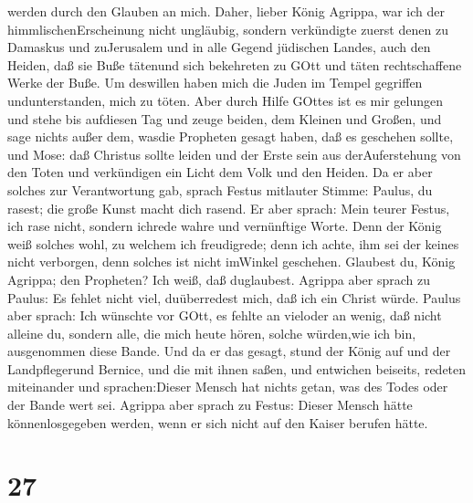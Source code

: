werden durch den Glauben an mich.  Daher, lieber König
Agrippa, war ich der himmlischenErscheinung nicht ungläubig,
 sondern verkündigte zuerst denen zu Damaskus und
zuJerusalem und in alle Gegend jüdischen Landes, auch den Heiden, daß
sie Buße tätenund sich bekehreten zu GOtt und täten rechtschaffene Werke
der Buße.  Um deswillen haben mich die Juden im Tempel
gegriffen undunterstanden, mich zu töten.  Aber durch Hilfe
GOttes ist es mir gelungen und stehe bis aufdiesen Tag und zeuge beiden,
dem Kleinen und Großen, und sage nichts außer dem, wasdie Propheten
gesagt haben, daß es geschehen sollte, und Mose:  daß
Christus sollte leiden und der Erste sein aus derAuferstehung von den
Toten und verkündigen ein Licht dem Volk und den Heiden. 
Da er aber solches zur Verantwortung gab, sprach Festus mitlauter
Stimme: Paulus, du rasest; die große Kunst macht dich rasend.
 Er aber sprach: Mein teurer Festus, ich rase nicht,
sondern ichrede wahre und vernünftige Worte.  Denn der
König weiß solches wohl, zu welchem ich freudigrede; denn ich achte, ihm
sei der keines nicht verborgen, denn solches ist nicht imWinkel
geschehen.  Glaubest du, König Agrippa; den Propheten? Ich
weiß, daß duglaubest.  Agrippa aber sprach zu Paulus: Es
fehlet nicht viel, duüberredest mich, daß ich ein Christ würde.
 Paulus aber sprach: Ich wünschte vor GOtt, es fehlte an
vieloder an wenig, daß nicht alleine du, sondern alle, die mich heute
hören, solche würden,wie ich bin, ausgenommen diese Bande. 
Und da er das gesagt, stund der König auf und der Landpflegerund
Bernice, und die mit ihnen saßen,  und entwichen beiseits,
redeten miteinander und sprachen:Dieser Mensch hat nichts getan, was des
Todes oder der Bande wert sei.  Agrippa aber sprach zu
Festus: Dieser Mensch hätte könnenlosgegeben werden, wenn er sich nicht
auf den Kaiser berufen hätte.

\hypertarget{section-26}{%
\section{27}\label{section-26}}

